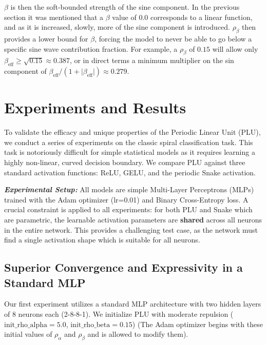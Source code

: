 \documentclass[11pt, letterpaper]{article}
\begin{document}
$\beta$ is then the soft-bounded strength of the sine component. In the previous section it was mentioned that a $\beta$ value of $0.0$ corresponds to a linear function, and as it is increased, slowly, more of the sine component is introduced. $\rho_\beta$ then provides a lower bound for $\beta$, forcing the model to never be able to go below a specific sine wave contribution fraction. For example, a $\rho_\beta$ of $0.15$ will allow only $\beta_{\text{eff}} \ge \sqrt{0.15} \approx 0.387$, or in direct terms a minimum multiplier on the sin component of $\beta_{\text{eff}} / (1 + \lvert\beta_{\text{eff}}\rvert) \approx 0.279$.

\section{Experiments and Results}

To validate the efficacy and unique properties of the Periodic Linear Unit (PLU), we conduct a series of experiments on the classic spiral classification task. This task is notoriously difficult for simple statistical models as it requires learning a highly non-linear, curved decision boundary. We compare PLU against three standard activation functions: ReLU, GELU, and the periodic Snake activation.

\textit{\textbf{Experimental Setup:}} All models are simple Multi-Layer Perceptrons (MLPs) trained with the Adam optimizer (lr=0.01) and Binary Cross-Entropy loss. A crucial constraint is applied to all experiments: for both PLU and Snake which are parametric, the learnable activation parameters are \textbf{shared} across all neurons in the entire network. This provides a challenging test case, as the network must find a single activation shape which is suitable for all neurons.

\subsection{Superior Convergence and Expressivity in a Standard MLP}

Our first experiment utilizes a standard MLP architecture with two hidden layers of 8 neurons each (2-8-8-1). We initialize PLU with moderate repulsion ($\text{init\_rho\_alpha}=5.0$, $\text{init\_rho\_beta}=0.15$) (The Adam optimizer begins with these initial values of $\rho_\alpha$ and $\rho_\beta$ and is allowed to modify them).
\end{document}
